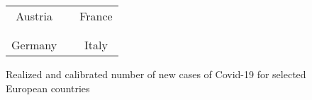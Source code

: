 \documentclass[12pt]{article}
\begin{document}
\begin{figure}[htp]%
\caption
{Realized and calibrated number of new cases of Covid-19 for selected European countries}%
\vspace{-0.2cm}%
\label{fig: Euro_dc}

\begin{center}%
\begin{tabular}
[c]{ccc}%
Austria &  & France\\%
{\includegraphics[
height=2.1465in,
width=2.6783in
]%
{figs/Austria_ER_N50000_guess5_2W_dcT.png}%
}
&  &
{\includegraphics[
height=2.1465in,
width=2.6783in
]%
{figs/France_ER_N50000_guess5_2W_dcT.png}%
}
\\
&  & \\
Germany &  & Italy\\%

\end{tabular}
\end{center}
\end{figure}
\end{document}
